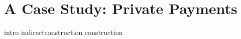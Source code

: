 \section{A Case Study: Private Payments}
\label{app:privatepayments}

{intro}
{indirectconstruction}
{construction}

